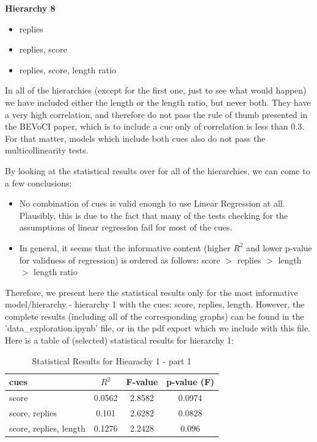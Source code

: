\documentclass[11pt, oneside]{article}   	%
\begin{document}
\textbf{Hierarchy 8}
\begin{itemize}
    \item replies
    \item replies, score
    \item replies, score, length ratio
\end{itemize}

In all of the hierarchies (except for the first one, just to see what would happen) we have included either the length or the length ratio, but never both. They have a very high correlation, and therefore do not pass the rule of thumb presented in the BEVoCI paper, which is to include a cue only of correlation is less than 0.3. For that matter, models which include both cues also do not pass the multicollinearity tests.

By looking at the statistical results over for all of the hierarchies, we can come to a few conclusions:
\begin{itemize}
    \item No combination of cues is valid enough to use Linear Regression at all. Plausibly, this is due to the fact that many of the tests checking for the assumptions of linear regression fail for most of the cues.
    \item In general, it seems that the informative content (higher $R^2$ and lower p-value for validness of regression) is ordered as follows: score $>$ replies $>$ length $>$ length ratio
    \end{itemize}

Therefore, we present here the statistical results only for the most informative model/hierarchy - hierarchy 1 with the cues: score, replies, length. However, the complete results (including all of the corresponding graphs) can be found in the 'data\_exploration.ipynb' file, or in the pdf export which we include with this file.\\

Here is a table of (selected) statistical results for hierarchy 1:
\begin{table}[H]
  \begin{center}
  \begin{tabular}{|l|c|c|c|}
    \hline
    cues & $R^2$ & F-value & p-value (F) \\
    \hline
    score & 0.0562 & 2.8582 & 0.0974 \\
    score, replies & 0.101 & 2.6282 & 0.0828  \\
    score, replies, length & 0.1276 & 2.2428 & 0.096  \\
    \hline
  \end{tabular}
  \caption{Statistical Results for Hiearachy 1 - part 1}
  \end{center}
\end{table}
\end{document}
